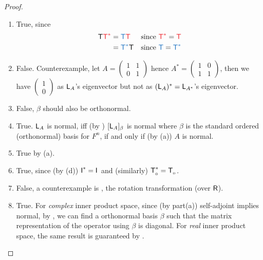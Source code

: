 \begin{proof} \ 

\begin{enumerate}
\item True, since
\begin{align*}
    \T \RED{\T^*} & = \BLUE{\T} \RED{\T} & \text{since \(\RED{\T^*} = \RED{\T}\)} \\
        & = \BLUE{\T^*} \T & \text{since \(\BLUE{\T} = \BLUE{\T^*}\)}
\end{align*}

\item False.
Counterexample, let \(A = \begin{pmatrix} 1 & 1 \\ 0 & 1 \end{pmatrix}\) hence \(A^* = \begin{pmatrix} 1 & 0 \\ 1 & 1 \end{pmatrix}\), then we have \(\begin{pmatrix} 1 \\ 0 \end{pmatrix}\) as \(\textsf{L}_A\)'s eigenvector but not as \((\textsf{L}_A)^* = \textsf{L}_{A^*}\)'s eigenvector.

\item False, \(\beta\) should also be orthonormal.

\item True.
\(\textsf{L}_A\) is normal, iff (by ) \([\textsf{L}_A]_{\beta}\) is normal where \(\beta\) is the standard ordered (orthonormal) basis for \(F^n\), if and only if (by (a)) \(A\) is normal.

\item True by (a).
\item True, since (by (d)) \(\textsf{I}_{_{}}^* = \textsf{I}_{_{}}\) and (similarly) \(\textsf{T}_{_0}^* = \textsf{T}_{_0}\).

\item False, a counterexample is , the rotation transformation (over \(\textsf{R}\)).

\item True.
For \emph{complex} inner product space, since (by part(a)) self-adjoint implies normal, by , we can find a orthonormal basis \(\beta\) such that the matrix representation of the operator using \(\beta\) is diagonal.
For \emph{real} inner product space, the same result is guaranteed by .
\end{enumerate}
\end{proof}

